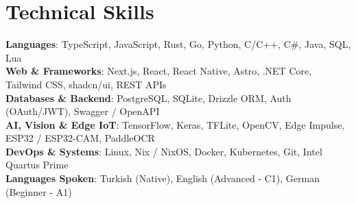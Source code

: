 \documentclass[letterpaper,11pt]{article}
\begin{document}
\section{Technical Skills}
 \begin{itemize}[leftmargin=0.15in, label={}]
    \small{\item{
     \textbf{Languages}{: TypeScript, JavaScript, Rust, Go, Python, C/C++, C\#, Java, SQL, Lua} \\
     \textbf{Web \& Frameworks}{: Next.js, React, React Native, Astro, .NET Core, Tailwind CSS, shadcn/ui, REST APIs} \\
     \textbf{Databases \& Backend}{: PostgreSQL, SQLite, Drizzle ORM, Auth (OAuth/JWT), Swagger / OpenAPI} \\
     \textbf{AI, Vision \& Edge IoT}{: TensorFlow, Keras, TFLite, OpenCV, Edge Impulse, ESP32 / ESP32-CAM, PaddleOCR} \\
     \textbf{DevOps \& Systems}{: Linux, Nix / NixOS, Docker, Kubernetes, Git, Intel Quartus Prime} \\
     \textbf{Languages Spoken}{: Turkish (Native), English (Advanced - C1), German (Beginner - A1)}
    }}
 \end{itemize}


\end{document}
